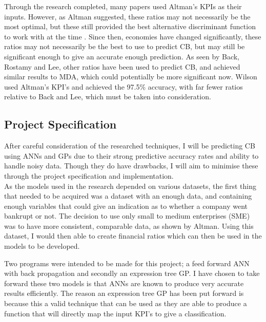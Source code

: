 \documentclass[11pt]{article}
\begin{document}
Through the research completed, many papers used Altman's KPIs as their inputs. However, as Altman suggested, these ratios may not necessarily be the most optimal, but these still provided the best alternative discriminant function to work with at the time \cite{ref-six}. Since then, economies have changed significantly, these ratios may not necessarily be the best to use to predict CB, but may still be significant enough to give an accurate enough prediction. As seen by Back, Rostamy and Lee\cite{ref-thirt,ref-twelve, ref-eleven}, other ratios have been used to predict CB, and achieved similar results to MDA, which could potentially be more significant now. Wilson used Altman's KPI's and achieved the 97.5\% accuracy, with far fewer ratios relative to Back and Lee, which must be taken into consideration.
\subsection{Project Specification}\label{subsec:proj}
After careful consideration of the researched techniques, I will be predicting CB using ANNs and GPs due to their strong predictive accuracy rates and ability to handle noisy data. Though they do have drawbacks, I will aim to minimise these through the project specification and implementation.\\

As the models used in the research depended on various datasets, the first thing that needed to be acquired was a dataset with an enough data, and containing enough variables that could give an indication as to whether a company went bankrupt or not. The decision to use only small to medium enterprises (SME) was to have more consistent, comparable data, as shown by Altman. Using this dataset, I would then able to create financial ratios which can then be used in the models to be developed. 

Two programs were intended to be made for this project; a feed forward ANN with back propagation and secondly an expression tree GP.  I have chosen to take forward these two models is that ANNs are known to produce very accurate results efficiently. The reason an expression tree GP has been put forward is because this a valid technique that can be used as they are able to produce a function that will directly map the input KPI's to give a classification.
\end{document}
